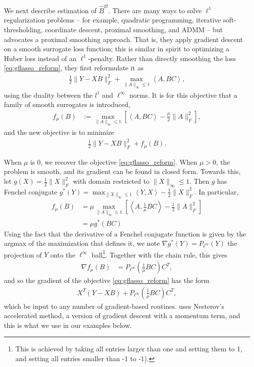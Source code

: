 \documentclass{article}
\begin{document}
We next describe estimation of $\hat{B}^{\text{gf}}$. There are many ways to
solve $\ell^{1}$ regularization problems -- for example, quadratic programming,
iterative soft-thresholding, coordinate descent, proximal smoothing, and ADMM --
but \cite{chen2010graph} advocates a proximal smoothing approach. That is, they
apply gradient descent on a smooth surrogate loss function; this is similar in
spirit to optimizing a Huber loss instead of an $\ell^{1}$-penalty. Rather than
directly smoothing the loss \ref{eq:gflasso_reform}, they first reformulate it
as
\begin{align*}
  \frac{1}{2}\|Y - XB\|_{F}^{2} + \max_{\|A\|_{\infty} \leq 1}
  \left<A, BC\right>,
\end{align*}
using the duality between the $l^{1}$ and $\ell^{\infty}$ norms. It is
for this objective that a family of smooth surrogates is introduced,
\begin{align*}
f_{\mu}\left(B\right) &:= \max_{\|A\|_{\infty} \leq 1}
\left[\left<A, BC\right> - \frac{\mu}{2}\|A\|_{F}^{2}\right],
\end{align*}
and the new objective is to minimize
\begin{align*}
\frac{1}{2}\|Y - XB\|_{F}^{2} + f_{\mu}\left(B\right).
\end{align*}

When $\mu$ is 0, we recover the objective \ref{eq:gflasso_reform}. When $\mu >
0$, the problem is smooth, and its gradient can be found in closed form. Towards
this, let $g\left(X\right) = \frac{1}{2}\|X\|_{F}^{2}$ with domain restricted to
$\|X\|_{\infty} \leq 1$. Then $g$ has Fenchel conjugate $g^{\ast}\left(Y\right)
= \max_{\|X\|_{\infty}\leq 1}\left<Y, X\right> - \frac{1}{2}\|X\|_{F}^{2}$. In
particular,
\begin{align*}
f_{\mu}\left(B\right) &=  \mu \max_{\|A\|_{\infty} \leq 1}
\left[\left<A, \frac{1}{\mu}BC\right> - \frac{1}{2}\|A\|_{F}^{2}\right] \\
&= \mu g^{\ast}\left(BC\right)
\end{align*}
Using the fact that the derivative of a Fenchel conjugate function is given by
the argmax of the maximization that defines it, we note $\nabla
g^{\ast}\left(Y\right) = P_{\ell^{\infty}}\left(Y\right)$ the projection of $Y$
onto the $\ell^{\infty}$ ball\footnote{This is achieved by taking all entries
  larger than one and setting them to 1, and setting all entries smaller than -1
  to -1).}. Together with the chain rule, this gives
\begin{align*}
  \nabla f_{\mu}\left(B\right) &= P_{\ell^{\infty}}\left(\frac{1}{\mu}BC\right)C^{T},
\end{align*}
and so the gradient of the objective \ref{eq:gflasso_reform} has the form
\begin{align*}
 X^{T}\left(Y - XB\right) + P_{\ell^{\infty}}\left(\frac{1}{\mu}BC\right)C^{T},
\end{align*}
which be input to any number of gradient-based routines. \cite{chen2010graph}
uses Nesterov's accelerated method, a version of gradient descent with a
momentum term, and this is what we use in our examples below.
\end{document}
